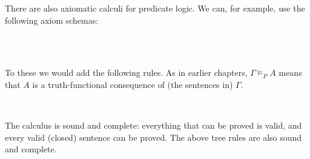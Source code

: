 There are also axiomatic calculi for predicate logic. We can, for example, use
the following axiom schemas:
%
\begin{principles}
  \\
  \\
\end{principles}
%
To these we would add the following rules. As in earlier chapters, $\Gamma \models_{P} A$ means that $A$ is a truth-functional consequence of (the sentences in) $\Gamma$.
\begin{principles}
  \\
\end{principles}


The calculus is sound and complete: everything that can be proved is valid, and
every valid (closed) sentence can be proved. The above tree rules are also sound
and complete.

